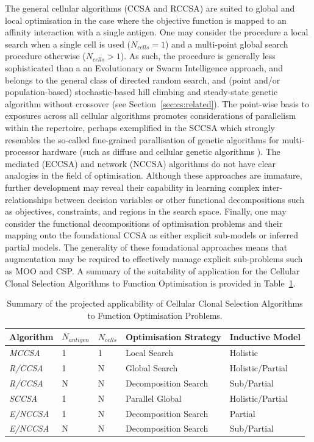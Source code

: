 The general cellular algorithms (CCSA and RCCSA) are suited to global and local optimisation in the case where the objective function is mapped to an affinity interaction with a single antigen. One may consider the procedure a local search when a single cell is used ($N_{cells}=1$) and a multi-point global search procedure otherwise ($N_{cells}>1$). As such, the procedure is generally less sophisticated than a an Evolutionary or Swarm Intelligence approach, and belongs to the general class of directed random search, and (point and/or population-based) stochastic-based hill climbing and steady-state genetic algorithm without crossover (see Section~\ref{sec:cs:related}). 
The point-wise basis to exposures across all cellular algorithms promotes considerations of parallelism within the repertoire, perhaps exemplified in the SCCSA which strongly resembles the so-called fine-grained parallisation of genetic algorithms for multi-processor hardware (such as diffuse and cellular genetic algorithms \cite{Pettey2000}).
The mediated (ECCSA) and network (NCCSA) algorithms do not have clear analogies in the field of optimisation. Although these approaches are immature, further development may reveal their capability in learning complex inter-relationships between decision variables or other functional decompositions such as objectives, constraints, and regions in the search space.
Finally, one may consider the functional decompositions of optimisation problems and their mapping onto the foundational CCSA as either explicit sub-models or inferred partial models. The generality of these foundational approaches means that augmentation may be required to effectively manage explicit sub-problems such as MOO and CSP.
A summary of the suitability of application for the Cellular Clonal Selection Algorithms to Function Optimisation is provided in Table~\ref{tab:iidle:function:optimisation:cellular}.

\begin{table}[htp]
	\centering\small
		\begin{tabular}{lllll}
		\toprule
		\textbf{Algorithm} & \textbf{$N_{antigen}$} & \textbf{$N_{cells}$} & \textbf{Optimisation Strategy} & \textbf{Inductive Model} \\ 
		\toprule
		\emph{MCCSA} & 1 & 1 & Local Search & Holistic \\ 
		\emph{R/CCSA} & 1 & N & Global Search & Holistic/Partial \\ 
		\emph{R/CCSA} & N & N & Decomposition Search & Sub/Partial \\ 
		\emph{SCCSA}  & 1 & N & Parallel Global & Holistic/Partial  \\ 
		\emph{E/NCCSA}  & 1 & N & Decomposition Search & Partial \\
		\emph{E/NCCSA}  & N & N & Decomposition Search & Sub/Partial \\ 		
		\bottomrule
		\end{tabular}
	\caption{Summary of the projected applicability of Cellular Clonal Selection Algorithms to Function Optimisation Problems.}
	\label{tab:iidle:function:optimisation:cellular}
\end{table}

